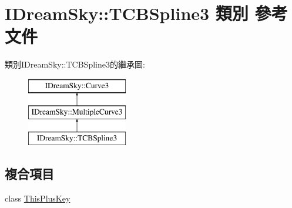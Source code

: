 \hypertarget{class_i_dream_sky_1_1_t_c_b_spline3}{}\section{I\+Dream\+Sky\+:\+:T\+C\+B\+Spline3 類別 參考文件}
\label{class_i_dream_sky_1_1_t_c_b_spline3}
類別\+I\+Dream\+Sky\+:\+:T\+C\+B\+Spline3的繼承圖\+:\begin{figure}[H]
\begin{center}
\leavevmode
\includegraphics[height=3.000000cm]{class_i_dream_sky_1_1_t_c_b_spline3}
\end{center}
\end{figure}
\subsection*{複合項目}
\begin{DoxyCompactItemize}
\item 
class \hyperlink{class_i_dream_sky_1_1_t_c_b_spline3_1_1_this_plus_key}{This\+Plus\+Key}
\end{DoxyCompactItemize}
